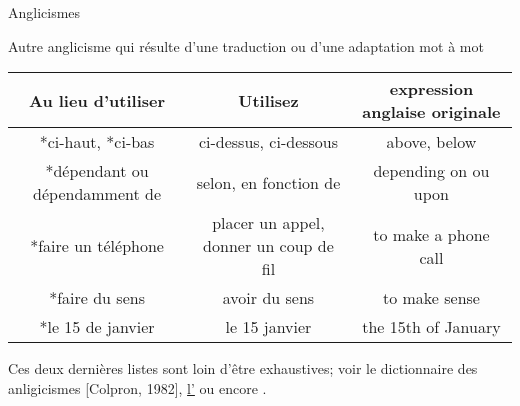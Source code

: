 \documentclass[french]{beamer}
\newcommand\red[1]{{\color{ulred}{\textbf{#1}}}}
\begin{document}
\begin{frame}{Anglicismes}

Autre anglicisme qui résulte d'une traduction ou d'une adaptation mot à mot
\begin{center}\tiny
	\begin{tabular}{ccc}
		\hline
		Au lieu d'utiliser & Utilisez & expression anglaise originale \\ 
		\hline
		*ci-haut, *ci-bas & ci-dessus, ci-dessous & above, below \\ 
		*dépendant ou dépendamment de & selon, en fonction de & depending on ou upon \\ 
		*faire un téléphone & placer un appel, donner un coup de fil & to make a phone call \\ 
		*faire du sens & avoir du sens & to make sense \\ 
		*le 15 de janvier & le 15 janvier & the 15th of January \\ 
		\hline
	\end{tabular} 
\end{center}

\vfill
\scriptsize{
Ces deux dernières listes sont loin d'être exhaustives; voir le dictionnaire des anligicismes [Colpron, 1982], \href{http://bdl.oqlf.gouv.qc.ca/bdl/gabarit_bdl.asp?T1=anglicisme&T3.x=0&T3.y=0}{l'\red{OQLF}} ou encore \href{http://www.alloprof.qc.ca/BV/pages/f1575.aspx}{\red{AlloProf}}.}

\end{frame}
\end{document}
